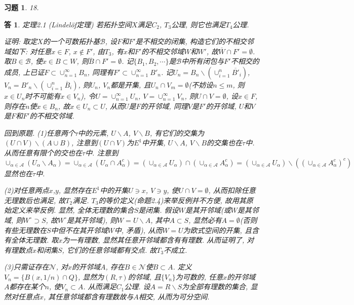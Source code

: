 \documentclass{ctexart}%
\newtheorem*{exercise}{习题}
\newtheorem*{solution}{答}
\theoremstyle{definition}
\theoremstyle{remark}
\begin{document}
\begin{exercise}18.
\end{exercise}
\begin{solution}
定理2.1 (Lindel\"{o}f定理) 若拓扑空间$X$满足$C_2$, $T_3$公理, 则它也满足$T_4$公理. 

证明: 取定$X$的一个可数拓扑基$\mathscr{B}$, 设$F$和$F'$是不相交的闭集, 构造它们的不相交邻域如下: 对任意$x\in F$, $x\notin F'$, 由$T_3$, 有$x$和$F'$的不相交邻域$W$和$W'$, 故$\overline{W}\cap F'=\emptyset$. 取$B\in \mathscr{B}$, 使$x\in B\subset W$, 则$\overline{B}\cap F'=\emptyset$. 记$\{B_1,B_2,\cdots\}$是$\mathscr{B}$中所有闭包与$F'$不相交的成员, 上已证$F\subset \cup_{n=1}^\infty B_n$, 同理有$F'\subset \cup_{n=1}^\infty B'_n$. 记$U_n=B_n\backslash (\cup_{i=1}^n\overline{B'}_i)$, $V_n=B'_n\backslash (\cup_{i=1}^n \overline{B}_i)$, 则$U_n$, $V_n$都是开集, 且$U_n\cap V_m=\emptyset$(不妨设$n\leq m$, 则$x\in U_n$时不可能有$x\in V_n$), 令$U=\cup_{n=1}^\infty U_n$, $V=\cup_{n=1}^\infty V_n$, 则$U\cap V=\emptyset$, 设$x\in F$, 则存在$n$使$x\in B_n$, 故$x\in U_n\subset U$, 从而$U$是$F$的开邻域, 同理$V$是$F'$的开邻域, $U$和$V$是$F$和$F'$的不相交邻域. 

回到原题. (1)任意两个$\tau$中的元素, $U\backslash A$, $V\backslash B$, 有它们的交集为$(U\cap V)\backslash(A\cup B)$, 注意到$(U\cap V)$为$E^1$中开集, $U\backslash A$, $V\backslash B$的交集也在$\tau$中. 从而任意有限个的交也在$\tau$中. 注意到$\cup_{\alpha\in \mathscr{A}} (U_\alpha\backslash A_\alpha)
=\cup_{\alpha\in \mathscr{A}}  (U_\alpha\cap A^c_{\alpha})=(\cup_{\alpha\in\mathscr{A}} U_\alpha)\cap
(\cup_{\alpha\in\mathscr{A}} A^c_{\alpha})=(\cup_{\alpha\in\mathscr{A}} U_\alpha)\backslash((\cup_{\alpha\in\mathscr{A}} A^c_{\alpha})^c)$显然也在$\tau$中. 

(2)对任意两点$x$,$y$, 显然存在$E^1$中的开集$U\ni x$, $V\ni y$, 使$U\cap V=\emptyset$, 从而扣除任意无理数后也满足, 故$T_2$满足. $T_3$的等价定义(命题2.4)来举反例并不方便, 故用其原始定义来举反例. 显然, 全体无理数的集合$S$是闭集. 假设$W$是其开邻域(或$W$是其邻域, 则$W^\circ\supset S$, 故$W^\circ$是其开邻域), 则$W=U\backslash A$, 其中$A\subset S$, 显然必有$A=\emptyset$(否则有些无理数在$S$中但不在其开邻域$W$中, 矛盾), 从而$W=U$为欧式空间的开集, 且含有全体无理数. 取$x$为一有理数, 显然其任意开邻域都含有有理数. 从而证明了, 对有理数点$x$和闭集$S$, 它们的任意邻域都有交点. 故$T_3$不成立. 

(3)只需证存在$\mathscr{N}$, 对$x$的开邻域$A$, 存在$B\in \mathscr{N}$使$B\subset A$. 定义$V_n=\{
B(x, 1/n)\cap Q\}$, 显然为$(R,\tau)$的邻域, 且$\{V_n\}$为可数的, 任意$x$的开邻域$A$都存在某个$n$, 使$V_n\subset A$. 从而满足$C_1$公理. 设$A=R\backslash S$为全部有理数的集合, 显然对任意点$x$, 其任意邻域都含有理数故与$A$相交, 从而为可分空间. 


\end{solution}
\end{document}
